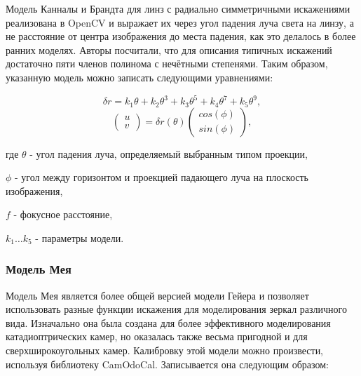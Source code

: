 Модель Канналы и Брандта \cite{opencv_model} для линз с радиально симметричными искажениями реализована в OpenCV и 
выражает их через угол падения луча света на линзу, а не расстояние                                                              
от центра изображения до места падения, как это делалось в более ранних моделях. Авторы посчитали, что для описания типичных искажений достаточно 
пяти членов полинома с нечётными степенями. Таким образом, указанную модель можно записать следующими уравнениями:
\begin{eqseries}
    \begin{equation}	
        \delta r = k_1\theta + k_2\theta^3 + k_3\theta^5 + k_4\theta^7 + k_5\theta^9,
        \label{eqn:kannala_r}
    \end{equation}
    \begin{equation}	
        \begin{pmatrix}u\\v\end{pmatrix} = \delta r(\theta)\begin{pmatrix}cos(\phi)\\sin(\phi)\end{pmatrix},
        \label{eqn:kannala_uv}
    \end{equation}
\end{eqseries}

где $\theta$ - угол падения луча, определяемый выбранным типом проекции,

\qquad $\phi$ - угол между горизонтом и проекцией падающего луча на плоскость изображения, 


\qquad $f$ - фокусное расстояние, 

\qquad $k_1 \dots k_5$ - параметры модели.

\vspace{\baselineskip}

\subsubsection{Модель Мея}

Модель Мея \cite{mei} является более общей версией модели Гейера \cite{geyer} и позволяет использовать разные 
функции искажения для моделирования зеркал различного вида. Изначально она была создана для более 
эффективного моделирования катадиоптрических камер, но оказалась также весьма пригодной и для сверхширокоугольных камер. 
Калибровку этой модели можно произвести, используя библиотеку CamOdoCal. Записывается она следующим образом:

